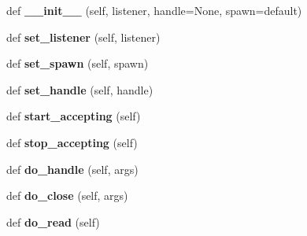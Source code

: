 \begin{DoxyCompactItemize}
\item 
\mbox{\label{classgevent_1_1baseserver_1_1_base_server_a130696056dd4bd44d572264bef83834a}} 
def {\bfseries \+\_\+\+\_\+init\+\_\+\+\_\+} (self, listener, handle=None, spawn=\textquotesingle{}default\textquotesingle{})
\item 
\mbox{\label{classgevent_1_1baseserver_1_1_base_server_ae956fc642f3593cfc33db70c3c040b43}} 
def {\bfseries set\+\_\+listener} (self, listener)
\item 
\mbox{\label{classgevent_1_1baseserver_1_1_base_server_a75180a98aa5e5843cbd0f7c05588265e}} 
def {\bfseries set\+\_\+spawn} (self, spawn)
\item 
\mbox{\label{classgevent_1_1baseserver_1_1_base_server_a5cfa5dc76f948a69f66fd5c2cf164205}} 
def {\bfseries set\+\_\+handle} (self, handle)
\item 
\mbox{\label{classgevent_1_1baseserver_1_1_base_server_a5d6e3d6dfaaee4bfba039b57fe597036}} 
def {\bfseries start\+\_\+accepting} (self)
\item 
\mbox{\label{classgevent_1_1baseserver_1_1_base_server_a197cfc14562200b064dfba71143f5d0b}} 
def {\bfseries stop\+\_\+accepting} (self)
\item 
\mbox{\label{classgevent_1_1baseserver_1_1_base_server_aa2b6b5b750eed22eae59651c3c315490}} 
def {\bfseries do\+\_\+handle} (self, args)
\item 
\mbox{\label{classgevent_1_1baseserver_1_1_base_server_a7fb9f7d64d578792b1706bb4cd12f902}} 
def {\bfseries do\+\_\+close} (self, args)
\item 
\mbox{\label{classgevent_1_1baseserver_1_1_base_server_afc653b0613000f67e7f779f4a7f2d89c}} 
def {\bfseries do\+\_\+read} (self)
\item 

\end{DoxyCompactItemize}
